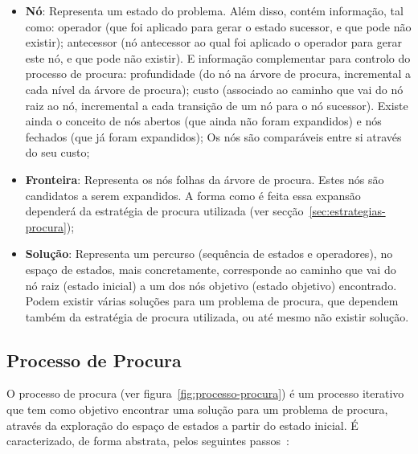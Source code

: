 \begin{itemize}
    \item \textbf{Nó}: Representa um estado do problema.
    Além disso, contém informação, tal como: operador (que foi aplicado para gerar o estado sucessor, e que pode não existir); antecessor (nó antecessor ao qual foi aplicado o operador para gerar este nó, e que pode não existir).
    E informação complementar para controlo do processo de procura: profundidade (do nó na árvore de procura, incremental a cada nível da árvore de procura); custo (associado ao caminho que vai do nó raiz ao nó, incremental a cada transição de um nó para o nó sucessor).
    Existe ainda o conceito de nós abertos (que ainda não foram expandidos) e nós fechados (que já foram expandidos);
    Os nós são comparáveis entre si através do seu custo;
    \item \textbf{Fronteira}: Representa os nós folhas da árvore de procura.
    Estes nós são candidatos a serem expandidos.
    A forma como é feita essa expansão dependerá da estratégia de procura utilizada (ver secção~\ref{sec:estrategias-procura});
    \item \textbf{Solução}: Representa um percurso (sequência de estados e operadores), no espaço de estados, mais concretamente, corresponde ao caminho que vai do nó raiz (estado inicial) a um dos nós objetivo (estado objetivo) encontrado.
    Podem existir várias soluções para um problema de procura, que dependem também da estratégia de procura utilizada, ou até mesmo não existir solução.
\end{itemize}

\subsection{Processo de Procura}\label{subsec:processo-procura}

O processo de procura (ver figura~\ref{fig:processo-procura}) é um processo iterativo que tem como objetivo encontrar uma solução para um problema de procura, através da exploração do espaço de estados a partir do estado inicial.
É caracterizado, de forma abstrata, pelos seguintes passos~\cite{isel:iasa:slides:proc-espaco-estados-parte-1}:

